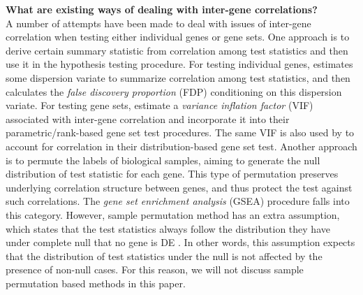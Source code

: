 \documentclass[12pt, a4paper]{article}
\begin{document}
	 \textbf{What are existing ways of dealing with inter-gene correlations?}\\
	 A number of attempts have been made to deal with issues of inter-gene correlation when testing either individual genes or gene sets. One 
	 approach is to derive certain summary statistic from correlation among test statistics and 
	 then use it in the hypothesis testing procedure. For testing individual genes, 
	 \citet{efron2007correlation} estimates some dispersion variate to summarize correlation among 
	 test statistics, and then calculates the \textit{false discovery 
	 proportion} (FDP) conditioning on this dispersion variate.  For 
	 testing gene sets, \citet{wu2012camera} estimate a \textit{variance inflation factor} (VIF) associated with inter-gene correlation and 
	 incorporate it into their parametric/rank-based gene set test procedures. The same VIF is also 
	 used by \citet{yaari2013quantitative} to account 
	 for correlation in their distribution-based gene set test. Another approach is to permute the 
	 labels of biological samples, aiming to generate the null distribution of test statistic for 
	 each gene.
	 This type of permutation preserves underlying correlation structure between genes, and thus 
	 protect the test against such correlations. The 
	 \textit{gene set enrichment analysis} (GSEA) procedure \citep{subramanian2005gene} falls into 
	 this category.
	 However, sample permutation method has an extra assumption, which states that the test 
	 statistics always follow the distribution they have under complete null  that no gene is DE \cite{efron2012large1}. In other words, this 
	 assumption expects that the distribution of test statistics under the null is not affected by 
	 the presence of non-null cases. For this reason, we will not discuss sample permutation based 
	 methods in this paper.  
	 
\end{document}
